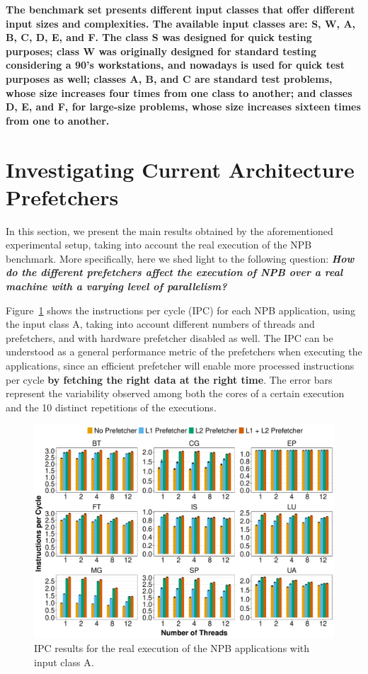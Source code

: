 \documentclass[AMA,final,STIX1COL]{WileyNJD-v2}
\newcommand\new[1]{{\color{red}\textbf{#1}}}
\begin{document}
\new{The benchmark set presents different input classes that offer different input sizes and complexities.
The available input classes are: S, W, A, B, C, D, E, and F.
The class S was designed for quick testing purposes; class W was originally designed for standard testing considering a 90's workstations, and nowadays is used for quick test purposes as well; classes A, B, and C are standard test problems, whose size increases four times from one class to another; and classes D, E, and F, for large-size problems, whose size increases sixteen times from one to another.}




\section{Investigating Current Architecture Prefetchers}\label{sec:real_ipc}

In this section, we present the main results obtained by the aforementioned experimental setup, taking into account the real execution of the NPB benchmark. 
More specifically, here we shed light to the following question: \new{\textit{How do the different prefetchers affect the execution of NPB over a real machine with a varying level of parallelism?}}



Figure~\ref{fig:ipc} shows the instructions per cycle (IPC) for each NPB application, using the input class A, taking into account different numbers of threads and prefetchers, and with hardware prefetcher disabled as well. 
The IPC can be understood as a general performance metric of the prefetchers when executing the applications, since an efficient prefetcher will enable more processed instructions per cycle \new{by fetching the right data at the right time}. 
The error bars represent the variability observed among both the cores of a certain execution and the 10 distinct repetitions of the executions.


\begin{figure}[b]
    \centering
    \includegraphics[width=\linewidth]{figures/fig2.pdf}
    \caption{IPC results for the real execution of the NPB applications with input class A.}
    \label{fig:ipc}
\end{figure}
\end{document}
